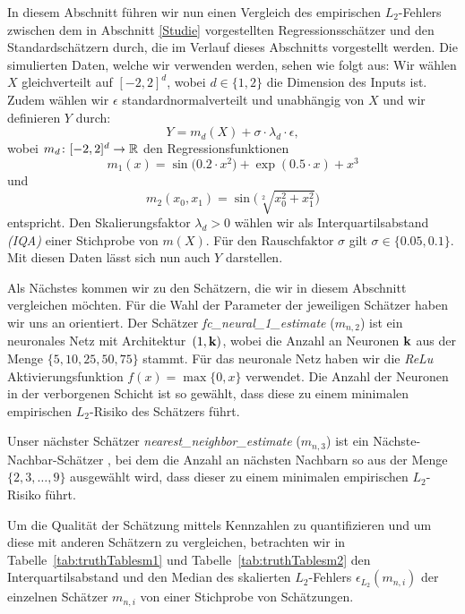 In diesem Abschnitt führen wir nun einen Vergleich des empirischen $L_2$-Fehlers zwischen dem in Abschnitt \ref{Studie} vorgestellten Regressionsschätzer und den Standardschätzern durch, die im Verlauf dieses Abschnitts vorgestellt werden.
Die simulierten Daten, welche wir verwenden werden, sehen wie folgt aus:
Wir wählen $X$ gleichverteilt auf $[-2, 2]^d$, wobei $d \in \{1,2\}$ die Dimension des Inputs ist. Zudem wählen wir $\epsilon$ standardnormalverteilt und unabhängig von $X$ und wir definieren $Y$ durch:
\begin{equation}
    \label{eq:Y}
    Y = m_d(X) + \sigma \cdot \lambda_d \cdot \epsilon,
\end{equation}
wobei $m_d \colon [-2, 2]^d \to \mathbb{R}$ den Regressionsfunktionen
$$ m_1(x) =  \sin\big(0.2 \cdot x^2\big) + \exp(0.5 \cdot x) + x^3$$
und
$$ m_2(x_0, x_1) = \sin\big(\sqrt[2]{x_0^2 + x_1^2}\big)$$
entspricht.
Den Skalierungsfaktor $\lambda_d > 0$ wählen wir als Interquartilsabstand \emph{(IQA)} einer Stichprobe von $m(X)$. Für den Rauschfaktor $\sigma$ gilt $\sigma \in \{0.05, 0.1\}.$ Mit diesen Daten lässt sich nun auch $Y$ darstellen. 

Als Nächstes kommen wir zu den Schätzern, die wir in diesem Abschnitt vergleichen möchten. Für die Wahl der Parameter der jeweiligen Schätzer haben wir uns an \cite{kohler19} orientiert.
Der Schätzer \textit{fc\_neural\_1\_estimate}  ($m_{n,2}$) ist ein neuronales Netz mit Architektur~$(1,\mathbf{k})$, wobei die Anzahl an Neuronen $\mathbf{k}$ aus der Menge $\{5, 10, 25, 50, 75\}$ stammt. Für das neuronale Netz haben wir die \emph{ReLu} Aktivierungsfunktion $f(x) = \max\{0,x\}$ verwendet. Die Anzahl der Neuronen in der verborgenen Schicht ist so gewählt, dass diese zu einem minimalen empirischen $L_2$-Risiko des Schätzers führt.

Unser nächster Schätzer \textit{nearest\_neighbor\_estimate} ($m_{n,3}$) ist ein Nächste-Nachbar-Schätzer \cite[Kapitel~7.1]{fahrmeir2009regression}, bei dem die Anzahl an nächsten Nachbarn so aus der Menge $\{ 2,3,\dots,9\}$ ausgewählt wird, dass dieser zu einem minimalen empirischen $L_2$-Risiko führt.

Um die Qualität der Schätzung mittels Kennzahlen zu quantifizieren und um diese mit anderen Schätzern zu vergleichen, betrachten wir in Tabelle~\ref{tab:truthTablesm1} und Tabelle~\ref{tab:truthTablesm2} den Interquartilsabstand und den Median des skalierten $L_2$-Fehlers $\epsilon_{L_2}(m_{n,i})$ der einzelnen Schätzer $m_{n,i}$ von einer Stichprobe von Schätzungen. 

